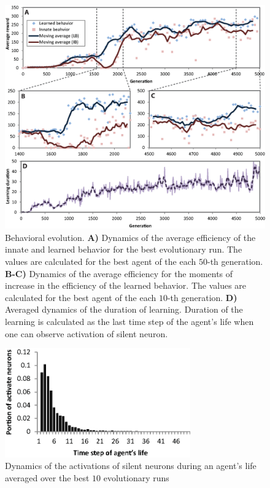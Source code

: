 \documentclass[letterpaper]{article}
\begin{document}
\begin{figure}[!t]
\begin{center}
\includegraphics[width=16cm]{Fig3_Behavior_Evolution.eps}
\caption{Behavioral evolution. \textbf{A)} Dynamics of the average efficiency of the innate and learned behavior for the best evolutionary run. The values are calculated for the best agent of the each $50$-th generation. \textbf{B-C)} Dynamics of the average efficiency for the moments of increase in the efficiency of the learned behavior. The values are calculated for the best agent of the each $10$-th generation. \textbf{D)} Averaged dynamics of the duration of learning. Duration of the learning is calculated as the last time step of the agent's life when one can observe activation of silent neuron.}
\label{Behavior_Evolution}
\end{center}
\end{figure}             

\begin{figure}[!b]
\begin{center}
\includegraphics[width=8cm]{Fig4.eps}
\caption{Dynamics of the activations of silent neurons during an agent's life averaged over the best $10$ evolutionary runs}
\label{Activations_dynamics}
\end{center}
\end{figure}
\end{document}
